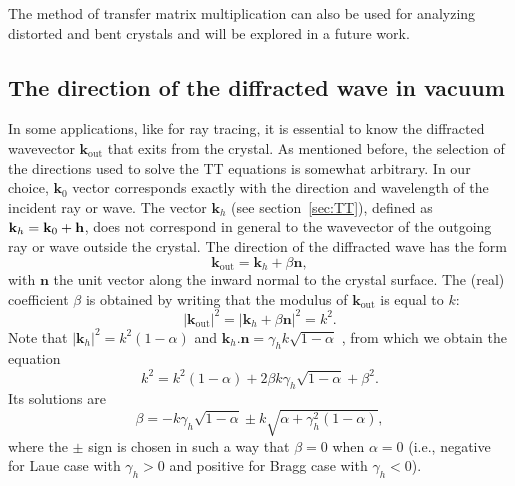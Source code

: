 \documentclass[preprint]{iucr}              %
\begin{document}
 The method of transfer matrix multiplication can also be used for analyzing distorted and bent crystals and will be explored in a future work.
 
\subsection{The direction of the diffracted wave in vacuum}\label{sec:directions}

In some applications, like for ray tracing, it is essential to know the diffracted wavevector $\textbf{k}_{\text{out}}$ that exits from the crystal. As mentioned before, the selection of the directions used to solve the TT equations is somewhat arbitrary. In our choice, $\textbf{k}_0$ vector corresponds exactly with the direction and wavelength of the incident ray or wave.
The vector $\textbf{k}_h$ (see section~\ref{sec:TT}), defined  as $\textbf k_h=\textbf k_0 + \textbf h$, does not correspond in general to the wavevector of the outgoing ray or wave outside the crystal. The direction of the diffracted wave has the form 
\begin{equation}
    \textbf{k}_{\text{out}} = \textbf{k}_h + \beta \textbf{n}, \nonumber
\end{equation}
with $\textbf{n}$ the unit vector along the inward normal to the crystal surface. The (real) coefficient $\beta$ is obtained by writing that the modulus of $\textbf{k}_{\text{out}}$ is equal to $k$:
\begin{equation}
    |\textbf{k}_{\text{out}}|^2 = |\textbf{k}_h + \beta \textbf{n}|^2=k^2. \nonumber
\end{equation}
Note that $|\textbf{k}_h|^2=k^2(1-\alpha)$ and $\textbf{k}_h . \textbf{n} = \gamma_h k \sqrt{1-\alpha}$ , from which we obtain the equation
\begin{equation}
    k^2 = k^2 (1-\alpha) + 
    2 \beta k \gamma_h \sqrt{1-\alpha}
    + \beta^2. \nonumber
\end{equation}
Its solutions are
\begin{equation}
    \beta = - k \gamma_h \sqrt{1-\alpha} \pm k \sqrt{\alpha + \gamma_h^2 (1-\alpha)}, \nonumber
\end{equation}
where the $\pm$ sign is chosen in such a way that $\beta=0$ when $\alpha=0$ (i.e., negative for Laue case with $\gamma_h>0$ and positive for Bragg case with $\gamma_h<0$).
\end{document}
